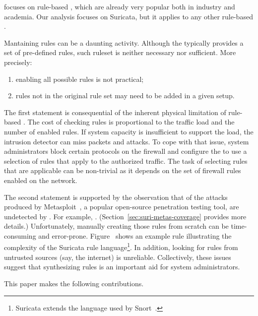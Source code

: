 \documentclass[conference]{IEEEtran}
\begin{document}

focuses on rule-based \nids{}, which are already very
popular both in industry and academia. Our analysis focuses on
Suricata, but it applies to any other rule-based \nids{}.



Mantaining \nids{} rules can be a daunting activity. Although the
\nids{} typically provides a set of pre-defined rules, such ruleset is
neither necessary nor sufficient. More precisely:

\begin{enumerate}
\item enabling all possible rules is not practical;
\item rules not in the original rule set may need to be added in a
  given setup.
\end{enumerate}

The first statement is consequential of the inherent physical
limitation of rule-based \nids{}. The cost of checking rules is
proportional to the traffic load and the number of enabled rules. If
system capacity is insufficient to support the load, the intrusion
detector can miss packets and attacks. To cope with that issue, system administrators
block certain protocols on the firewall and configure the \nids{} to
use a selection of rules that apply to the authorized traffic.  The
task of selecting rules that are applicable can be non-trivial as it
depends on the set of firewall rules enabled on the network.

The second statement is supported by the observation that
\numundetected{} of the attacks produced by
Metasploit~\cite{metasploit}, a popular open-source penetration
testing tool, are undetected by \suri{}. For example,
. (Section~\ref{sec:suri-metas-coverage} provides more
details.) Unfortunately, manually creating those rules from scratch
can be time-consuming and error-prone. Figure~  shows an
example rule illustrating the complexity of the Suricata rule
language\footnote{Suricata extends the language used by
  Snort~\cite{snort}.}.  In addition, looking for rules from untrusted
sources (say, the internet) is unreliable. Collectively, these issues
suggest that synthesizing \nids{} rules is an important aid for system
administrators.


This paper makes the following contributions. 
\end{document}

